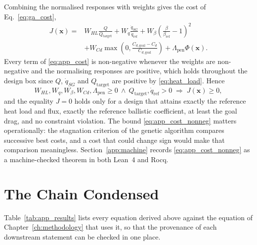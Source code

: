 Combining the normalised responses with weights gives the cost of Eq.~\eqref{eq:ga_cost},
\begin{equation}
\begin{aligned}
    J(\mathbf{x}) = {} & W_{HL}\frac{Q}{Q_{\mathrm{target}}} + W_{q}\frac{\dot{q}_{SG}}{\dot{q}_{\mathrm{ref}}}
    + W_{\beta}\left(\frac{\beta}{\beta_{\mathrm{ref}}} - 1\right)^{2} \\
    & + W_{Cd}\max\!\left(0, \frac{C_{d,\mathrm{goal}} - C_d}{C_{d,\mathrm{goal}}}\right)
    + \Lambda_{\mathrm{pen}}\Phi(\mathbf{x}) .
\end{aligned}
    \label{eq:app_cost}
\end{equation}
Every term of \eqref{eq:app_cost} is non-negative whenever the weights are non-negative and the normalising responses are positive, which holds throughout the design box since $Q$, $\dot{q}_{SG}$ and $Q_{\mathrm{target}}$ are positive by \eqref{eq:heat_load}. Hence
\begin{equation}
    W_{HL}, W_q, W_\beta, W_{Cd}, \Lambda_{\mathrm{pen}} \ge 0 \ \wedge\ Q_{\mathrm{target}}, \dot{q}_{\mathrm{ref}} > 0
    \;\Longrightarrow\;
    J(\mathbf{x}) \ge 0 ,
    \label{eq:app_cost_nonneg}
\end{equation}
and the equality $J = 0$ holds only for a design that attains exactly the reference heat load and flux, exactly the reference ballistic coefficient, at least the goal drag, and no constraint violation. The bound \eqref{eq:app_cost_nonneg} matters operationally: the stagnation criterion of the genetic algorithm compares successive best costs, and a cost that could change sign would make that comparison meaningless. Section~\ref{app:machine} records \eqref{eq:app_cost_nonneg} as a machine-checked theorem in both Lean~4 and Rocq.

\section{The Chain Condensed}
\label{app:chain_table}

Table~\ref{tab:app_results} lists every equation derived above against the equation of Chapter~\ref{ch:methodology} that uses it, so that the provenance of each downstream statement can be checked in one place.

